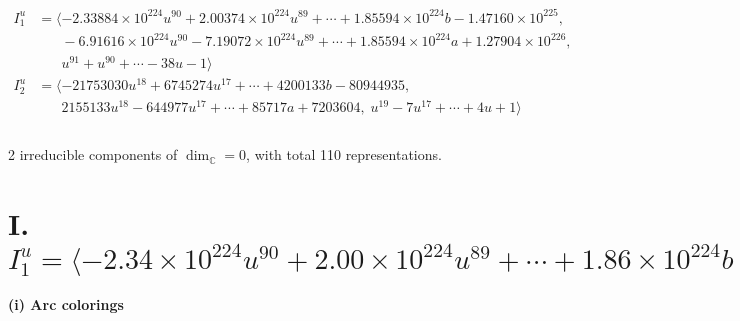 \documentclass[1p]{elsarticle_modified}
\theoremstyle{definition}
\begin{document}
\begin{align*}
I^u_{1}&=\langle 
-2.33884\times10^{224} u^{90}+2.00374\times10^{224} u^{89}+\cdots+1.85594\times10^{224} b-1.47160\times10^{225},\\
\phantom{I^u_{1}}&\phantom{= \langle  }-6.91616\times10^{224} u^{90}-7.19072\times10^{224} u^{89}+\cdots+1.85594\times10^{224} a+1.27904\times10^{226},\\
\phantom{I^u_{1}}&\phantom{= \langle  }u^{91}+u^{90}+\cdots-38 u-1\rangle \\
I^u_{2}&=\langle 
-21753030 u^{18}+6745274 u^{17}+\cdots+4200133 b-80944935,\\
\phantom{I^u_{2}}&\phantom{= \langle  }2155133 u^{18}-644977 u^{17}+\cdots+85717 a+7203604,\;u^{19}-7 u^{17}+\cdots+4 u+1\rangle \\
\\
\end{align*}
\raggedright * 2 irreducible components of $\dim_{\mathbb{C}}=0$, with total 110 representations.\\
\newpage
\renewcommand{\arraystretch}{1}
\centering \section*{I. $I^u_{1}= \langle -2.34\times10^{224} u^{90}+2.00\times10^{224} u^{89}+\cdots+1.86\times10^{224} b-1.47\times10^{225},\;-6.92\times10^{224} u^{90}-7.19\times10^{224} u^{89}+\cdots+1.86\times10^{224} a+1.28\times10^{226},\;u^{91}+u^{90}+\cdots-38 u-1 \rangle$}
\flushleft \textbf{(i) Arc colorings}\\
\end{document}
